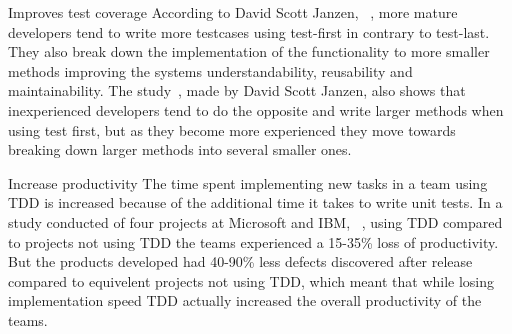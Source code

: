 Improves test coverage
According to David Scott Janzen, ~\cite{janzen}, more mature developers tend to write more testcases using test-first in contrary to test-last. They also break down the implementation of the functionality to more smaller methods improving the systems understandability, reusability and maintainability. The study~\cite{janzen}, made by David Scott Janzen, also shows that inexperienced developers tend to do the opposite and write larger methods when using test first, but as they become more experienced they move towards breaking down larger methods into several smaller ones.

Increase productivity
The time spent implementing new tasks in a team using TDD is increased because of the additional time it takes to write unit tests. In a study conducted of four projects at Microsoft and IBM, ~\cite{microsoftibm}, using TDD compared to projects not using TDD the teams experienced a 15-35\% loss of productivity. But the products developed had 40-90\% less defects discovered after release compared to equivelent projects not using TDD, which meant that while losing implementation speed TDD actually increased the overall productivity of the teams. 
  
%
%





